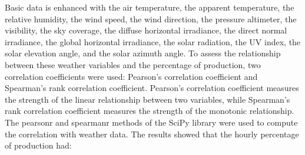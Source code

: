 Basic data is enhanced with the air temperature, the apparent temperature, the relative humidity, the wind speed, the wind direction, the pressure altimeter, the visibility, the sky coverage, the diffuse horizontal irradiance, the direct normal irradiance, the global horizontal irradiance, the solar radiation, the UV index, the solar elevation angle, and the solar azimuth angle.
To assess the relationship between these weather variables and the percentage of production, two correlation coefficients were used: Pearson's correlation coefficient and Spearman's rank correlation coefficient.
Pearson's correlation coefficient measures the strength of the linear relationship between two variables, while Spearman's rank correlation coefficient measures the strength of the monotonic relationship.
The pearsonr and spearmanr methods of the SciPy library were used to compute the correlation with weather data.
The results showed that the hourly percentage of production had:
